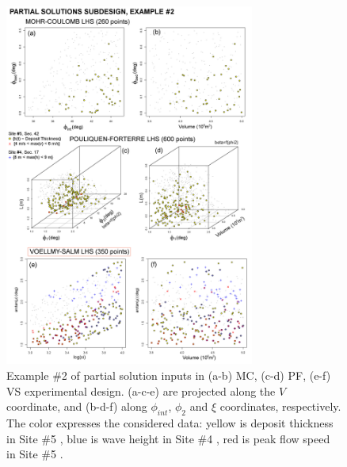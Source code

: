 \documentclass[nhess, manuscript]{copernicus}
\begin{document}
\begin{figure}[H]
\centering
\includegraphics[width=0.73\textwidth]{Fig11.png}
\caption{Example \#2 of partial solution inputs in (a-b) MC, (c-d) PF, (e-f) VS experimental design. (a-c-e) are projected along the $V$ coordinate, and (b-d-f) along $\phi_{int}$, $\phi_2$ and $\xi$ coordinates, respectively. The color expresses the considered data: yellow is deposit thickness in Site \#5 \citep{Saucedo2008}, blue is wave height in Site \#4 \citep{PonceSegura1983}, red is peak flow speed in Site \#5 \citep{Pierson1985}.}
\label{Fig11}
\end{figure}
\end{document}
